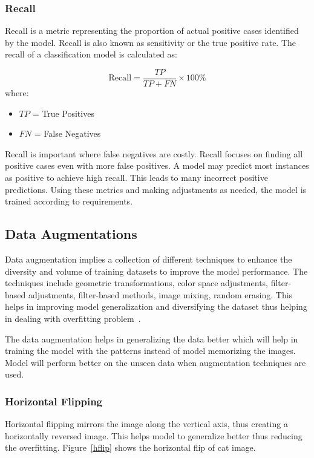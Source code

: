 \subsubsection{Recall}
Recall is a metric representing the proportion of actual positive cases identified by the model. Recall is also known as sensitivity or the true positive rate. The recall of a classification model is calculated as:

\begin{equation}
  \text{Recall} = \frac{TP}{TP + FN} \times 100\%
  \label{eq:recall}
\end{equation}
where:
\begin{itemize}
  \item $TP$ = True Positives
  \item $FN$ = False Negatives
\end{itemize}

Recall is important where false negatives are costly. Recall focuses on finding all positive cases even with more false positives. A model may predict most instances as positive to achieve high recall. This leads to many incorrect positive predictions. Using these metrics and making adjustments as needed, the model is trained according to requirements. 

\subsection{Data Augmentations}\label{sec:augmentation}
Data augmentation implies a collection of different techniques  to enhance the diversity and volume of training datasets to improve the model performance. The techniques include geometric transformations, color space adjustments, filter-based adjustments, filter-based methods, image mixing, random erasing. This helps in improving model generalization and diversifying the dataset thus helping in dealing with overfitting problem~\cite{Augmentation}. 

The data augmentation helps in generalizing the data better which will help in training the model with the patterns instead of model memorizing the images. Model will perform better on the unseen data when augmentation techniques are used. 

\subsubsection{Horizontal Flipping}
Horizontal flipping mirrors the image along the vertical axis, thus creating a horizontally reversed image. This helps model to generalize better thus reducing the overfitting. Figure~\ref{hflip} shows the horizontal flip of cat image.

